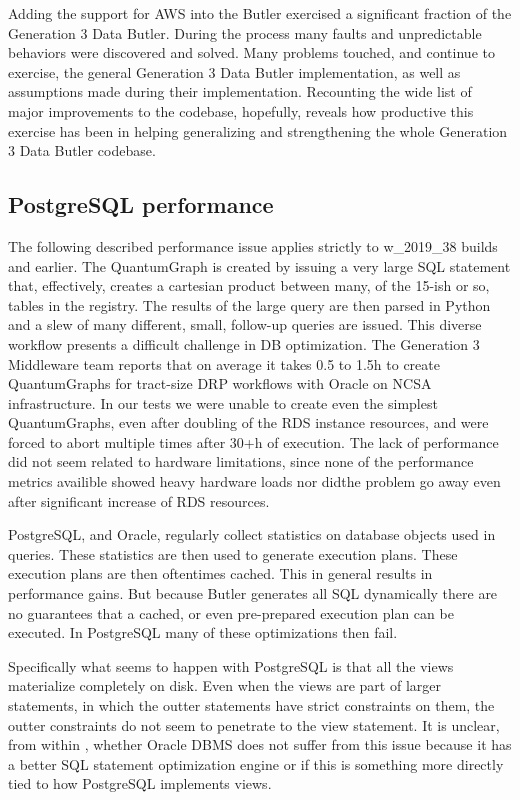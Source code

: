 Adding the support for AWS into the Butler exercised a significant fraction of the Generation 3 Data Butler. During the process many faults and unpredictable behaviors were discovered and solved. Many problems touched, and continue to exercise, the general Generation 3 Data Butler implementation, as well as assumptions made during their implementation. Recounting the wide list of major improvements to the codebase, hopefully, reveals how productive this exercise has been in helping generalizing and strengthening the whole Generation 3 Data Butler codebase.

\subsection{PostgreSQL performance}

The following described performance issue applies strictly to w\_2019\_38 builds and earlier. The QuantumGraph is created by issuing a very large SQL statement that, effectively, creates a cartesian product between many, of the 15-ish or so, tables in the registry. The results of the large query are then parsed in Python and a slew of many different, small, follow-up queries are issued. This diverse workflow presents a difficult challenge in DB optimization. The Generation 3 Middleware team reports that on average it takes 0.5 to 1.5h to create QuantumGraphs for tract-size DRP workflows with Oracle on NCSA infrastructure. In our tests we were unable to create even the simplest QuantumGraphs, even after doubling of the RDS instance resources, and were forced to abort multiple times after 30+h of execution. The lack of performance did not seem related to hardware limitations, since none of the performance metrics availible showed heavy hardware loads nor didthe problem go away even after significant increase of RDS resources.

PostgreSQL, and Oracle, regularly collect statistics on database objects used in queries. These statistics are then used to generate execution plans. These execution plans are then oftentimes cached. This in general results in performance gains. But because Butler generates all SQL dynamically there are no guarantees that a cached, or even pre-prepared execution plan can be executed. In PostgreSQL many of these optimizations then fail.

Specifically what seems to happen with PostgreSQL is that all the views materialize completely on disk. Even when the views are part of larger statements, in which the outter statements have strict constraints on them, the outter constraints do not seem to penetrate to the view statement. It is unclear, from within \poc, whether Oracle DBMS does not suffer from this issue because it has a better SQL statement optimization engine or if this is something more directly tied to how PostgreSQL implements views. 

